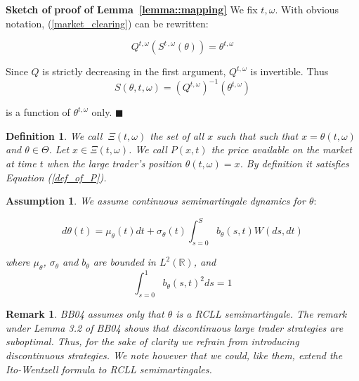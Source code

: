 \documentclass{article}
\newtheorem{definition}{Definition}
\newtheorem{remark}{Remark}
\newtheorem{assumption}{Assumption}
\begin{document}
\textbf{Sketch of} \textbf{proof of Lemma~\ref{lemma::mapping}} We fix $%
t,\omega $. With obvious notation, (\ref{market_clearing}) can be rewritten:

\begin{equation*}
Q^{t,\omega }(S^{t\,,\omega }(\theta ))=\theta ^{t,\omega }
\end{equation*}

Since $Q$ is strictly decreasing in the first argument, $Q^{t,\omega }$ is
invertible. Thus%
\begin{equation*}
S(\theta ,t,\omega )=(Q^{t,\omega })^{-1}(\theta ^{t,\omega })
\end{equation*}

is a function of $\theta ^{t,\omega }$ only. $\blacksquare $



\begin{definition}
We call $\ \Xi (t,\omega )$ the set of all $x$ such that such that $x=\theta
(t,\omega )$ and $\theta \in \Theta $. Let $x\in \Xi (t,\omega )$. We call $%
P(x,t)$ the price available on the market at time $t$ when the large
trader's position $\theta (t,\omega )=x$. By definition it satisfies
Equation (\ref{def_of_P}).
\end{definition}



\begin{assumption}
\label{ass::theta_semimartingale} We assume continuous semimartingale
dynamics for $\theta :$

\begin{equation*}
d\theta (t)=\mu _{\theta }(t)dt+\sigma _{\theta }(t)\int_{s=0}^{S}b_{\theta
}(s,t)W(ds,dt)
\end{equation*}

where $\mu _{\theta }$, $\sigma _{\theta }$ and $b_{\theta }$ are bounded in
$L^{2}(\mathbb{R})$, and
\begin{equation*}
\int_{s=0}^1 b_\theta(s,t)^2 ds = 1
\end{equation*}
\end{assumption}



\begin{remark}
\label{rem::boundness_p} BB04 assumes only that $\theta $ is a RCLL
semimartingale. The remark under Lemma 3.2 of BB04 shows that discontinuous
large trader strategies are suboptimal. Thus, for the sake of clarity we
refrain from introducing discontinuous strategies. We note however that we
could, like them, extend the Ito-Wentzell formula to RCLL semimartingales.
\end{remark}
\end{document}
